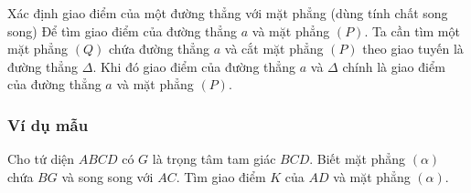 \begin{dang}{Xác định giao điểm của một đường thẳng với mặt phẳng (dùng tính chất song song)}
	Để tìm giao điểm của đường thẳng $a$ và mặt phẳng $(P)$. Ta cần tìm một mặt phẳng $(Q)$ chứa đường thẳng $a$ và cắt mặt phẳng $(P)$ theo giao tuyến là đường thẳng $\Delta$. Khi đó giao điểm của đường thẳng $a$ và $\Delta$ chính là giao điểm của đường thẳng $a$ và mặt phẳng $(P)$.	
\end{dang}
\subsubsection{Ví dụ mẫu}
\begin{vd}%
	Cho tứ diện $ABCD$ có $G$ là trọng tâm tam giác $BCD$. Biết mặt phẳng $(\alpha)$ chứa $BG$ và song song với $AC$. Tìm giao điểm $K$ của $AD$ và mặt phẳng $(\alpha)$.
\end{vd}
